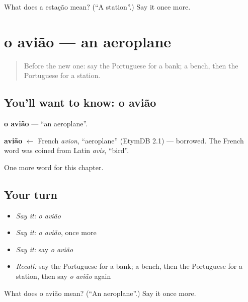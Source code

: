 \begin{tcolorbox}[breakable,colback=teal!4,colframe=teal!35!black,title={Before you move on}]
What does a estação mean? (\textquotedblleft{}A station\textquotedblright{}.) Say it once more.
\end{tcolorbox}
\section[o avião]{o avião — an aeroplane}

\label{lesson:PT-C74-aviao}



\begin{quote}
Before the new one: say the Portuguese for a bank; a bench, then the Portuguese for a station.
\end{quote}

\subsection*{You'll want to know: o avião}
\textbf{o avião} — \textquotedblleft{}an aeroplane\textquotedblright{}.

\begin{cousinweb}
\textbf{avião} $\leftarrow$ French \emph{avion}, \textquotedblleft{}aeroplane\textquotedblright{} (EtymDB 2.1) — borrowed. The French word was coined from Latin \emph{avis}, \textquotedblleft{}bird\textquotedblright{}.
\end{cousinweb}

\begin{grammarlens}[title={What you've built}]
One more word for this chapter.
\end{grammarlens}

\subsection*{Your turn}
\begin{itemize}
\raggedright
  \item \emph{Say it:} \emph{o avião}
  \item \emph{Say it:} \emph{o avião}, once more
  \item \emph{Say it:} say \emph{o avião}
  \item \emph{Recall:} say the Portuguese for a bank; a bench, then the Portuguese for a station, then say \emph{o avião} again
\end{itemize}

\begin{tcolorbox}[breakable,colback=teal!4,colframe=teal!35!black,title={Before you move on}]
What does o avião mean? (\textquotedblleft{}An aeroplane\textquotedblright{}.) Say it once more.
\end{tcolorbox}
